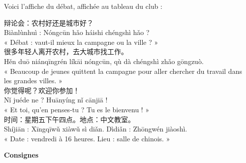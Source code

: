 \documentclass[11pt]{article}
\begin{document}
Voici l'affiche du débat, affichée au tableau du club :

\begin{textebox}
辩论会：农村好还是城市好？\\
Biànlùnhuì : Nóngcūn hǎo háishi chéngshì hǎo ?\\
« Débat : vaut-il mieux la campagne ou la ville ? »\\[0.5em]
很多年轻人离开农村，去大城市找工作。\\
Hěn duō niánqīngrén líkāi nóngcūn, qù dà chéngshì zhǎo gōngzuò.\\
« Beaucoup de jeunes quittent la campagne pour aller chercher du travail dans les grandes villes. »\\[0.5em]
你觉得呢？欢迎你参加！\\
Nǐ juéde ne ? Huānyíng nǐ cānjiā !\\
« Et toi, qu'en penses-tu ? Tu es le bienvenu ! »\\[0.5em]
时间：星期五下午四点。地点：中文教室。\\
Shíjiān : Xīngqīwǔ xiàwǔ sì diǎn. Dìdiǎn : Zhōngwén jiàoshì.\\
« Date : vendredi à 16 heures. Lieu : salle de chinois. »
\end{textebox}

\textbf{Consignes}
\end{document}
